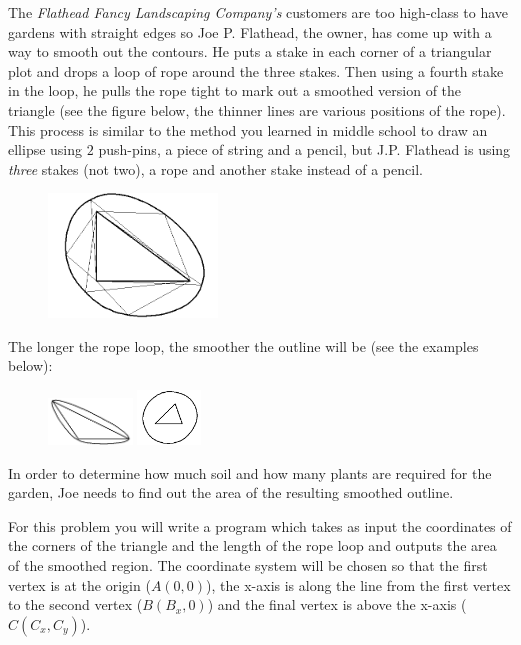 
The \emph{Flathead Fancy Landscaping Company's} customers are too high-class to have gardens with
straight edges so Joe P. Flathead, the owner, has come up with a way to smooth out the contours.
He puts a stake in each corner of a triangular plot and drops a loop of rope around the three stakes.
Then using a fourth stake in the loop, he pulls the rope tight to mark out a smoothed version of the
triangle (see the figure below, the thinner lines are various positions of the rope). This process is
similar to the method you learned in middle school to draw an ellipse using $2$ push-pins, a piece of
string and a pencil, but J.P. Flathead is using \emph{three} stakes (not two), a rope and another stake instead
of a pencil.

\begin{figure}[!h]
\begin{center}
\includegraphics[width=0.4\textwidth]{jgardens-001.png}
\end{center}
\end{figure}

The longer the rope loop, the smoother the outline will be (see the examples below):

\begin{figure}[!h]
\includegraphics[width=0.2\textwidth]{jgardens-002.png}
\includegraphics[width=0.15\textwidth]{jgardens-003.png}
\end{figure}

In order to determine how much soil and how many plants are required for the garden, Joe needs to
find out the area of the resulting smoothed outline.

For this problem you will write a program which takes as input the coordinates of the corners of the
triangle and the length of the rope loop and outputs the area of the smoothed region. The coordinate
system will be chosen so that the first vertex is at the origin ($A(0, 0)$), the x-axis is along the line
from the first vertex to the second vertex ($B(B_{x}, 0)$) and the final vertex is above the x-axis
($C(C_{x}, C_{y})$).

